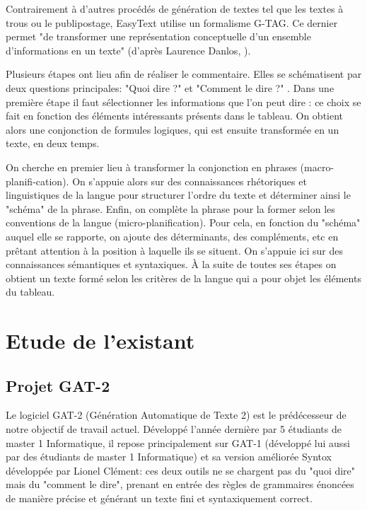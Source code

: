 \documentclass[12pt]{report}
\begin{document}
Contrairement à d'autres procédés de génération de textes tel que les textes à trous ou le publipostage, EasyText utilise un formalisme G-TAG. Ce dernier permet "de transformer une représentation conceptuelle d'un ensemble d'informations en un texte" (d'après Laurence Danlos, \cite {Dan10}). 

\bigskip

Plusieurs étapes ont lieu afin de réaliser le commentaire. Elles se schématisent par deux questions principales: "Quoi dire ?" et "Comment le dire ?" . Dans une première étape il faut sélectionner les informations que l'on peut dire : ce choix se fait en fonction des éléments intéressants présents dans le tableau. On obtient alors une conjonction de formules logiques, qui est ensuite transformée en un texte, en deux temps.

On cherche en premier lieu à transformer la conjonction en phrases (macro-planifi-cation).  On s'appuie alors sur des connaissances rhétoriques et linguistiques de la langue pour structurer l'ordre du texte et déterminer ainsi le "schéma" de la phrase. Enfin, on complète la phrase pour la former selon les conventions de la langue (micro-planification). Pour cela, en fonction du "schéma" auquel elle se rapporte, on ajoute des déterminants, des compléments, etc en prêtant attention à la position à laquelle ils se situent. On s'appuie ici sur des connaissances sémantiques et syntaxiques.  À la suite de toutes ses étapes on obtient un texte formé selon les critères de la langue qui a pour objet les éléments du tableau. 


\section{Etude de l'existant}

\subsection{Projet GAT-2}

Le logiciel GAT-2 (Génération Automatique de Texte 2) \cite{GAT2} est le prédécesseur de notre objectif de travail actuel. Développé l'année dernière par 5 étudiants de master 1 Informatique, il repose principalement sur GAT-1 (développé lui aussi par des étudiants de master 1 Informatique) et sa version améliorée Syntox développée par Lionel Clément: ces deux outils ne se chargent pas du "quoi dire" mais du "comment le dire", prenant en entrée des règles de grammaires énoncées de manière précise et générant un texte fini et syntaxiquement correct.
\end{document}
